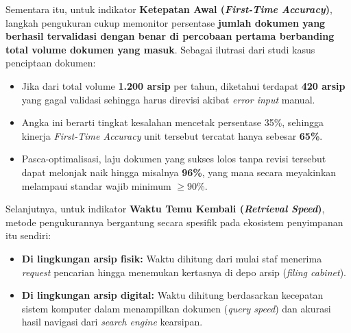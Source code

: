 \documentclass[12pt,a4paper]{report}
\begin{document}
Sementara itu, untuk indikator \textbf{Ketepatan Awal (\textit{First-Time Accuracy})}, langkah pengukuran cukup memonitor persentase \textbf{jumlah dokumen yang berhasil tervalidasi dengan benar di percobaan pertama berbanding total volume dokumen yang masuk}. Sebagai ilutrasi dari studi kasus penciptaan dokumen:
\begin{itemize}[leftmargin=*]
    \item Jika dari total volume \textbf{1.200 arsip} per tahun, diketahui terdapat \textbf{420 arsip} yang gagal validasi sehingga harus direvisi akibat \textit{error input} manual.
    \item Angka ini berarti tingkat kesalahan mencetak persentase 35\%, sehingga kinerja \textit{First-Time Accuracy} unit tersebut tercatat hanya sebesar \textbf{65\%}.
    \item Pasca-optimalisasi, laju dokumen yang sukses lolos tanpa revisi tersebut dapat melonjak naik hingga misalnya \textbf{96\%}, yang mana secara meyakinkan melampaui standar wajib minimum $\geq$90\%.
\end{itemize}

Selanjutnya, untuk indikator \textbf{Waktu Temu Kembali (\textit{Retrieval Speed})}, metode pengukurannya bergantung secara spesifik pada ekosistem penyimpanan itu sendiri:
\begin{itemize}[leftmargin=*]
    \item \textbf{Di lingkungan arsip fisik:} Waktu dihitung dari mulai staf menerima \textit{request} pencarian hingga menemukan kertasnya di depo arsip (\textit{filing cabinet}).
    \item \textbf{Di lingkungan arsip digital:} Waktu dihitung berdasarkan kecepatan sistem komputer dalam menampilkan dokumen (\textit{query speed}) dan akurasi hasil navigasi dari \textit{search engine} kearsipan.
\end{itemize}
\end{document}
